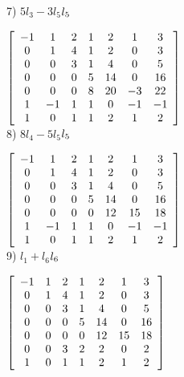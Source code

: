 \documentclass{article}
\begin{document}
7) $5l_{3} - 3l_{5} $\to$ l_{5}\\ 
\newline$

$\left[\begin{array}{ccccccc}
-1 &  1 &  2 &  1 &  2 &  1 &  3 \\
0  &  1 &  4 &  1 &  2 &  0 &  3 \\
0  &  0 &  3 &  1 &  4 &  0 &  5 \\ 
0  &  0 &  0 &  5 &  14&  0 &  16\\ 
0  &  0 &  0 &  8 &  20& -3 &  22\\ 
1  & -1 &  1 &  1 &  0 & -1 & -1 \\ 
1  &  0 &  1 &  1 &  2 &  1 &  2 \\ 
 \end{array}\right]\\
  \newline$\\
 
8) $8l_{4} - 5l_{5} $\to$ l_{5}\\ 
\newline$

$\left[\begin{array}{ccccccc}
-1 &  1 &  2 &  1 &  2 &  1 &  3 \\
0  &  1 &  4 &  1 &  2 &  0 &  3 \\
0  &  0 &  3 &  1 &  4 &  0 &  5 \\ 
0  &  0 &  0 &  5 &  14&  0 &  16\\ 
0  &  0 &  0 &  0 &  12& 15 &  18\\ 
1  & -1 &  1 &  1 &  0 & -1 & -1 \\ 
1  &  0 &  1 &  1 &  2 &  1 &  2 \\ 
 \end{array}\right]\\
  \newline$\\

9) $l_{1} + l_{6} $\to$ l_{6}\\ 
\newline$

$\left[\begin{array}{ccccccc}
-1 &  1 &  2 &  1 &  2 &  1 &  3 \\
0  &  1 &  4 &  1 &  2 &  0 &  3 \\
0  &  0 &  3 &  1 &  4 &  0 &  5 \\     
0  &  0 &  0 &  5 &  14&  0 &  16\\ 
0  &  0 &  0 &  0 &  12& 15 &  18\\ 
0  &  0	&  3 &  2 &  2 &  0 &   2\\ 
1  &  0 &  1 &  1 &  2 &  1 &   2 \\ 
 \end{array}\right]\\
  \newline$\\
  
\end{document}

